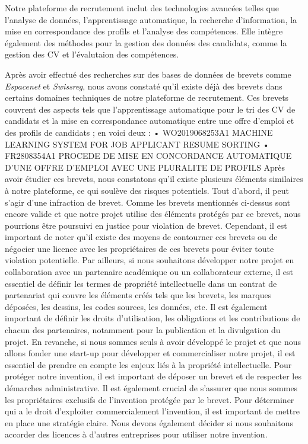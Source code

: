Notre plateforme de recrutement inclut des technologies avancées telles que l’analyse de données, l’apprentissage automatique, la recherche d’information, la mise en correspondance des profils et l’analyse des compétences. Elle intègre également des méthodes pour la gestion des données des candidats, comme la gestion des CV et l’évalutaion des compétences.\newline 

Après avoir effectué des recherches sur des bases de données de brevets comme \textit{Espacenet} et \textit{Swissreg}, nous avons constaté qu'il existe déjà des brevets dans certains domaines techniques de notre plateforme de recrutement. Ces brevets couvrent des aspects tels que l'apprentissage automatique pour le tri des CV de candidats et la mise en correspondance automatique entre une offre d'emploi et des profils de candidats ; en voici deux : 
•	WO2019068253A1 MACHINE LEARNING SYSTEM FOR JOB APPLICANT RESUME SORTING
•	FR2808354A1 PROCEDE DE MISE EN CONCORDANCE AUTOMATIQUE D'UNE OFFRE D'EMPLOI AVEC UNE PLURALITE DE PROFILS
Après avoir étudier ces  brevets, nous constatons qu’il existe plusieurs éléments similaires à notre plateforme, ce qui soulève des risques potentiels.
Tout d’abord, il peut s’agir d’une infraction de brevet. Comme les brevets mentionnés ci-dessus sont encore valide et que notre projet utilise des éléments protégés par ce brevet, nous pourrions être poursuivi en justice pour violation de brevet. 
Cependant, il est important de noter qu'il existe des moyens de contourner ces brevets ou de négocier une licence avec les propriétaires de ces brevets pour éviter toute violation potentielle. 
Par ailleurs, si nous souhaitons développer notre projet en collaboration avec un partenaire académique ou un collaborateur externe, il est essentiel de définir les termes de propriété intellectuelle dans un contrat de partenariat qui couvre les éléments créés tels que les brevets, les marques déposées, les dessins, les codes sources, les données, etc. Il est également important de définir les droits d'utilisation, les obligations et les contributions de chacun des partenaires, notamment pour la publication et la divulgation du projet.
En revanche, si nous sommes seuls à avoir développé le projet et que nous allons fonder une start-up pour développer et commercialiser notre projet, il est essentiel de prendre en compte les enjeux liés à la propriété intellectuelle. Pour protéger notre invention, il est important de déposer un brevet et de  respecter les démarches administrative. Il est également crucial de s'assurer que nous sommes les propriétaires exclusifs de l'invention protégée par le brevet. Pour déterminer qui a le droit d'exploiter commercialement l'invention, il est important de mettre en place une stratégie claire. Nous devons également décider si nous souhaitons accorder des licences à d'autres entreprises pour utiliser notre invention.
